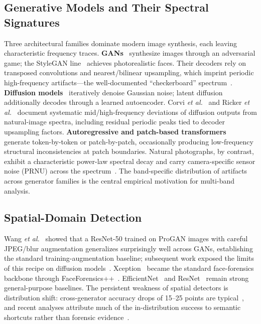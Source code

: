 \documentclass[journal]{IEEEtran}
\begin{document}
\subsection{Generative Models and Their Spectral Signatures}
Three architectural families dominate modern image synthesis, each leaving characteristic frequency traces. \textbf{GANs}~\cite{goodfellow2014} synthesize images through an adversarial game; the StyleGAN line~\cite{karras2019} achieves photorealistic faces. Their decoders rely on transposed convolutions and nearest/bilinear upsampling, which imprint periodic high-frequency artifacts---the well-documented ``checkerboard'' spectrum~\cite{zhang2019wifs,durall2020}. \textbf{Diffusion models}~\cite{ho2020,rombach2022} iteratively denoise Gaussian noise; latent diffusion additionally decodes through a learned autoencoder. Corvi \textit{et al.}~\cite{corvi2023} and Ricker \textit{et al.}~\cite{ricker2024} document systematic mid/high-frequency deviations of diffusion outputs from natural-image spectra, including residual periodic peaks tied to decoder upsampling factors. \textbf{Autoregressive and patch-based transformers}~\cite{betker2023} generate token-by-token or patch-by-patch, occasionally producing low-frequency structural inconsistencies at patch boundaries. Natural photographs, by contrast, exhibit a characteristic power-law spectral decay and carry camera-specific sensor noise (PRNU) across the spectrum~\cite{cozzolino2019}. The band-specific distribution of artifacts across generator families is the central empirical motivation for multi-band analysis.

\subsection{Spatial-Domain Detection}
Wang \textit{et al.}~\cite{wang2020} showed that a ResNet-50 trained on ProGAN images with careful JPEG/blur augmentation generalizes surprisingly well across GANs, establishing the standard training-augmentation baseline; subsequent work exposed the limits of this recipe on diffusion models~\cite{corvi2023}. Xception~\cite{chollet2017} became the standard face-forensics backbone through FaceForensics++~\cite{rossler2019}. EfficientNet~\cite{tan2019} and ResNet~\cite{he2016} remain strong general-purpose baselines. The persistent weakness of spatial detectors is distribution shift: cross-generator accuracy drops of 15--25 points are typical~\cite{ojha2023,zhu2023genimage}, and recent analyses attribute much of the in-distribution success to semantic shortcuts rather than forensic evidence~\cite{yan2025sanity}.
\end{document}
